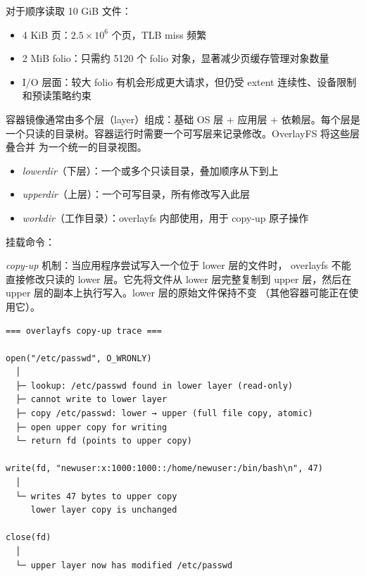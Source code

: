 \begin{filesystemlayout}
对于顺序读取 10 GiB 文件：
\begin{itemize}\tightlist
\item 4 KiB 页：$2.5 \times 10^6$ 个页，TLB miss 频繁
\item 2 MiB folio：只需约 5120 个 folio 对象，显著减少页缓存管理对象数量
\item I/O 层面：较大 folio 有机会形成更大请求，但仍受 extent 连续性、设备限制和预读策略约束
\end{itemize}


容器镜像通常由多个层（layer）组成：基础 OS 层 + 应用层 + 依赖层。每个层是
一个只读的目录树。容器运行时需要一个可写层来记录修改。OverlayFS 将这些层叠合并
为一个统一的目录视图。

\begin{itemize}\tightlist
\item \emph{lowerdir}（下层）：一个或多个只读目录，叠加顺序从下到上
\item \emph{upperdir}（上层）：一个可写目录，所有修改写入此层
\item \emph{workdir}（工作目录）：overlayfs 内部使用，用于 copy-up 原子操作
\end{itemize}

挂载命令：\\

\emph{copy-up} 机制：当应用程序尝试写入一个位于 lower 层的文件时，
overlayfs 不能直接修改只读的 lower 层。它先将文件从 lower 层完整复制到
upper 层，然后在 upper 层的副本上执行写入。lower 层的原始文件保持不变
（其他容器可能正在使用它）。

\begin{lstlisting}
=== overlayfs copy-up trace ===

open("/etc/passwd", O_WRONLY)
  │
  ├─ lookup: /etc/passwd found in lower layer (read-only)
  ├─ cannot write to lower layer
  ├─ copy /etc/passwd: lower → upper (full file copy, atomic)
  ├─ open upper copy for writing
  └─ return fd (points to upper copy)

write(fd, "newuser:x:1000:1000::/home/newuser:/bin/bash\n", 47)
  │
  └─ writes 47 bytes to upper copy
     lower layer copy is unchanged

close(fd)
  │
  └─ upper layer now has modified /etc/passwd


\end{lstlisting}
\end{filesystemlayout}
